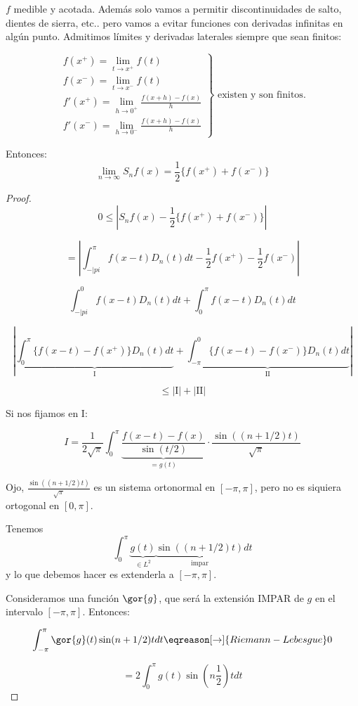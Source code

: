 	\begin{theorem} \label{thm:Dirichlet2}

		$f$ medible y acotada. Además solo vamos a permitir discontinuidades de salto, dientes de sierra, etc.. pero vamos a evitar funciones con derivadas infinitas en algún punto. Admitimos límites y derivadas laterales siempre que sean finitos:

		{}

		\[
		\left.
		\begin{array}{l}
			f(x^+) = \lim_{t \to x^+} f(t) \\
			f(x^-) = \lim_{t \to x^-} f(t) \\
			f'(x^+) = \lim_{h \to 0^+} \frac{f(x+h)-f(x)}{h} \\
			f'(x^-) = \lim_{h \to 0^-} \frac{f(x+h)-f(x)}{h}
		\end{array} \right\} \text{ existen y son finitos.}
		\]

		Entonces: \[ \lim_{n \to \infty} S_nf(x) = \frac{1}{2} \{f(x^+)+f(x^-)\}\]

	\end{theorem}

	\begin{proof}

		\[ 0 \leq | S_n f(x) - \frac{1}{2} \{f(x^+) + f(x^-)\} |\]

		\[ = \left| \int_{-|pi}^\pi f(x-t) D_n (t) dt - \frac{1}{2} f(x^+)- \frac{1}{2} f(x^-) \right|  \]

		\[ \int_{-|pi}^{0} f(x-t) D_n(t)dt + \int_{0}^\pi f(x-t) D_n(t) dt \]

		\[ \left| \underbrace{\int_0^\pi  \{ f(x-t) - f(x^+) \} D_n(t) dt }_{\text{I}} + \underbrace{\int_{-\pi}^{0}  \{ f(x-t) - f(x^-) \} D_n(t) dt }_{\text{II}} \right| \]

		\[\leq | \text{I} | +  |\text{II}| \]

		Si nos fijamos en I:

		\[ I = \frac{1}{2\sqrt{\pi}} \int_{0}^\pi \underbrace{\frac{f(x-t)-f(x)}{\sin(t/2)}}_{=g(t)} \cdot \frac{\sin((n+1/2)t)}{\sqrt{\pi}} \]

		Ojo, $\frac{\sin((n+1/2)t)}{\sqrt{\pi}}$ es un sistema ortonormal en $[-\pi,\pi]$, pero no es siquiera ortogonal en $[0,\pi]$.

		Tenemos
		\[ \int_{0}^\pi \underbrace{g(t)}_{\in L^2} \underbrace{\sin((n+1/2)t)}_{\text{impar}} dt \]
		y lo que debemos hacer es extenderla a $[-\pi,\pi]$.

		Consideramos una función $\gor{g}$, que será la extensión IMPAR de $g$ en el intervalo $[-\pi,\pi]$. Entonces:

		\[ \int_{-\pi}^\pi  \gor{g}(t) \sin(n+1/2)t dt \eqreason[\rightarrow]{Riemann-Lebesgue} 0 \]

		\[ = 2 \int_{0}^\pi g(t) \sin(n \frac{1}{2}) t dt \]


	\end{proof}


